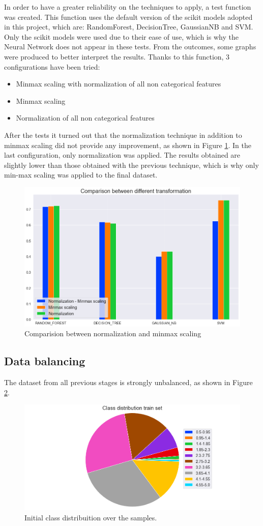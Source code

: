 \documentclass[../main]{subfiles}
\begin{document}
In order to have a greater reliability on the techniques to apply, a test function was created.
This function uses the default version of the scikit models adopted in this project, which are: RandomForest, DecisionTree, GaussianNB and SVM.
Only the scikit models were used due to their ease of use, which is why the Neural Network does not appear in these tests.
From the outcomes, some graphs were produced to better interpret the results.
Thanks to this function, 3 configurations have been tried:
\begin{itemize}
    \item Minmax scaling with normalization of all non categorical features
    \item Minmax scaling
    \item Normalization of all non categorical features
\end{itemize}

After the tests it turned out that the normalization technique in addition to minmax scaling did not provide any improvement, as shown in Figure \ref{fig:plot_data_transformation}.
In the last configuration, only normalization was applied.
The results obtained are slightly lower than those obtained with the previous technique, which is why only min-max scaling was applied to the final dataset.
\begin{figure}[htb]
    \center
    \includegraphics[width=0.75\linewidth]{figures/data_transformation.png}    
    \caption{Comparision between normalization and minmax scaling}
    \label{fig:plot_data_transformation}
\end{figure}

\subsection*{Data balancing}
The dataset from all previous stages is strongly unbalanced, as shown in Figure \ref{fig:unbalanced}.
\begin{figure}[h]
    \center
    \includegraphics[width=0.6\linewidth]{figures/class_distribution_initial.png}    
    \caption{Initial class distribuition over the samples.}
    \label{fig:unbalanced}
\end{figure}
\end{document}
